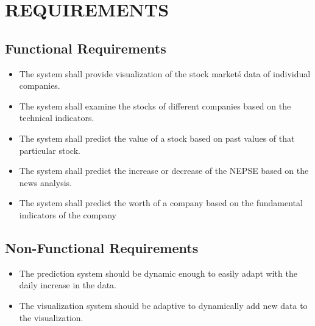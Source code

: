 \section{REQUIREMENTS}
\subsection{Functional Requirements}
\begin{itemize}
	\item The system shall provide visualization of the stock market\'s data of individual companies.
\item The system shall examine the stocks of different companies based on the technical indicators.
\item The system shall predict the value of  a stock based on past values of that particular stock.
\item The system shall predict the increase or decrease of the NEPSE based on the news analysis.
\item The system shall predict the worth of a company based on the fundamental indicators of the company
\end{itemize}

\subsection{ Non-Functional Requirements}
\begin{itemize}
	
	 \item The prediction system should be dynamic enough to easily adapt with the daily increase in the data.
\item The visualization system should be adaptive to dynamically add new data to the visualization.
   
\end{itemize}



